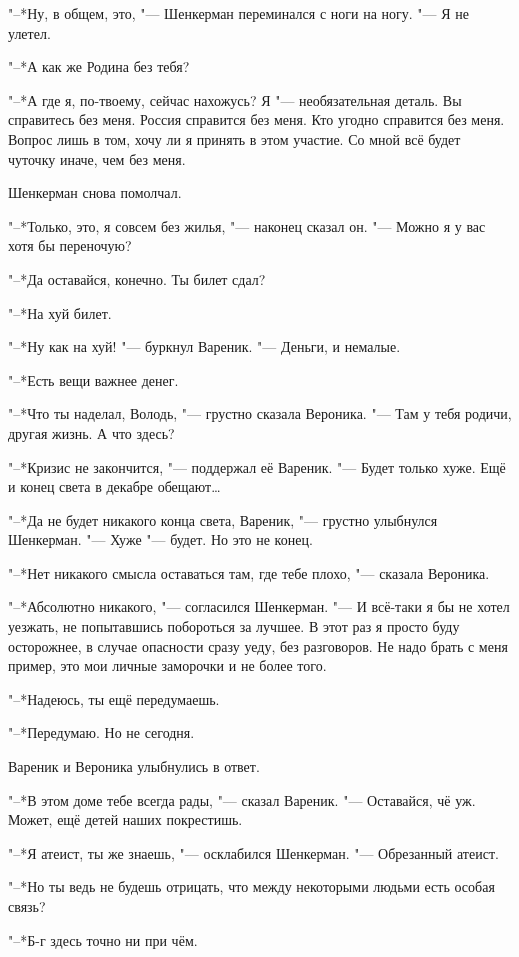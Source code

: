 "--*Ну, в общем, это, "--- Шенкерман переминался с ноги на ногу.
"--- Я не улетел.

"--*А как же Родина без тебя?

"--*А где я, по-твоему, сейчас нахожусь?
Я "--- необязательная деталь.
Вы справитесь без меня.
Россия справится без меня.
Кто угодно справится без меня.
Вопрос лишь в том, хочу ли я принять в этом участие.
Со мной всё будет чуточку иначе, чем без меня.

Шенкерман снова помолчал.

"--*Только, это, я совсем без жилья, "--- наконец сказал он.
"--- Можно я у вас хотя бы переночую?

"--*Да оставайся, конечно.
Ты билет сдал?

"--*На хуй билет.

"--*Ну как на хуй! "--- буркнул Вареник.
"--- Деньги, и немалые.

"--*Есть вещи важнее денег.

"--*Что ты наделал, Володь, "--- грустно сказала Вероника.
"--- Там у тебя родичи, другая жизнь.
А что здесь?

"--*Кризис не закончится, "--- поддержал её Вареник.
"--- Будет только хуже.
Ещё и конец света в декабре обещают\ldots{}

"--*Да не будет никакого конца света, Вареник, "--- грустно улыбнулся Шенкерман.
"--- Хуже "--- будет.
Но это не конец.

"--*Нет никакого смысла оставаться там, где тебе плохо, "--- сказала Вероника.

"--*Абсолютно никакого, "--- согласился Шенкерман.
"--- И всё-таки я бы не хотел уезжать, не попытавшись побороться за лучшее.
В этот раз я просто буду осторожнее, в случае опасности сразу уеду, без разговоров.
Не надо брать с меня пример, это мои личные заморочки и не более того.

"--*Надеюсь, ты ещё передумаешь.

"--*Передумаю.
Но не сегодня.

Вареник и Вероника улыбнулись в ответ.

"--*В этом доме тебе всегда рады, "--- сказал Вареник.
"--- Оставайся, чё уж.
Может, ещё детей наших покрестишь.

"--*Я атеист, ты же знаешь, "--- осклабился Шенкерман.
"--- Обрезанный атеист.

"--*Но ты ведь не будешь отрицать, что между некоторыми людьми есть особая связь?

"--*Б-г здесь точно ни при чём.

